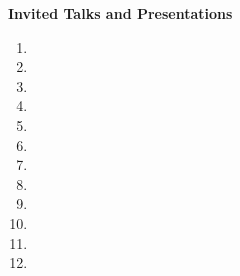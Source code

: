 \documentclass[10pt]{article}
\begin{document}
\vspace{1em} {\Large \textbf{Invited Talks and Presentations}}
\begin{enumerate}[resume]
\item {}
\item {}
\item {}
\item {}
\item {}
\item {}
\item {}
\item {}
\item {}
\item {}
\item {}
\item {}
\end{enumerate}
\end{document}
